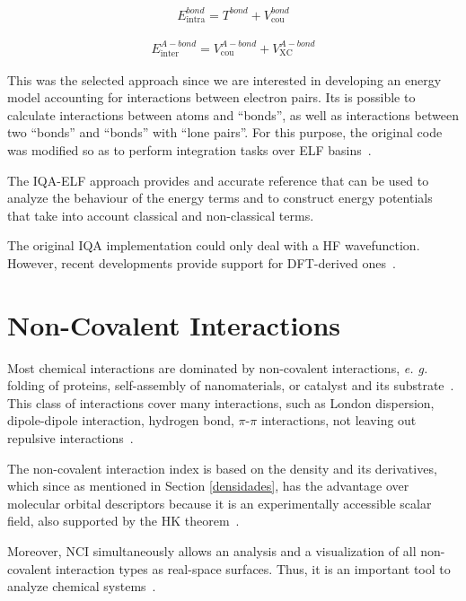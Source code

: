 \begin{align}
E_{\mathrm{intra}}^{bond} = T^{bond} + V_{\mathrm{cou}}^{bond}
\label{intra_bond}
\end{align}

\begin{align}
E_{\mathrm{inter}}^{A-bond} = V_{\mathrm{cou}}^{A-bond} + V_{\mathrm{XC}}^{A-bond}
\label{inter_bond}
\end{align}

This was the selected approach
since we are interested in developing an energy model accounting for
interactions between electron pairs.
Its is possible to calculate interactions between atoms and ``bonds'', as well
as interactions between two ``bonds'' and ``bonds'' with ``lone pairs''. For
this purpose, the original code was modified so as to perform integration
tasks over ELF basins~\cite{MartnPends2008}.

The IQA-ELF approach provides and accurate
reference that can be used to analyze the behaviour of the energy terms and to
construct energy potentials that take into account classical and non-classical
terms. 

The original IQA implementation could only deal with a HF wavefunction. However,
recent developments provide support for DFT-derived ones~\cite{Maxwell2016}.

\section{Non-Covalent Interactions}

Most chemical interactions are dominated by non-covalent interactions,
\textit{e. g.} folding of proteins, self-assembly of nanomaterials, or catalyst
and its substrate~\cite{Fenniri2001}. This class of interactions cover many
interactions, such as London dispersion, dipole-dipole interaction, hydrogen bond,
$\pi$-$\pi$ interactions, not leaving out repulsive
interactions~\cite{kollman1977noncovalent}.

The non-covalent interaction index is based on the density and its derivatives,
which since as mentioned in Section \ref{densidades},
has the advantage over molecular orbital descriptors because it is an
experimentally accessible scalar field, also supported by the
HK theorem~\cite{Hohenberg1964}.

Moreover, NCI simultaneously allows an analysis and a visualization of all
non-covalent interaction types as real-space surfaces. Thus, it is an important
tool to analyze chemical systems~\cite{Julia_Contreras_G2011_1,ContrerasG2011_2}.

